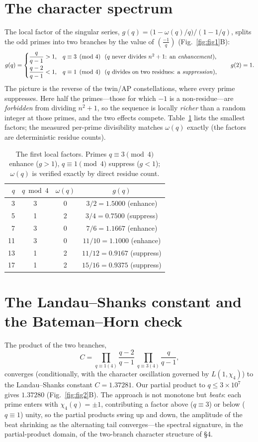 \documentclass[11pt]{article}
\theoremstyle{definition}
\begin{document}
\section{The character spectrum}
The local factor of the singular series, $g(q)=\bigl(1-\omega(q)/q\bigr)/(1-1/q)$, splits the odd
primes into two branches by the value of $\left(\frac{-1}{q}\right)$ (Fig.~\ref{fig:fig1}B):
\[
g(q)=
\begin{cases}
\dfrac{q}{q-1}>1,& q\equiv3\pmod4\ \ (\text{$q$ never divides $n^2+1$: an \emph{enhancement}}),\\[8pt]
\dfrac{q-2}{q-1}<1,& q\equiv1\pmod4\ \ (\text{$q$ divides on two residues: a \emph{suppression}}),
\end{cases}
\qquad g(2)=1.
\]
The picture is the reverse of the twin/AP constellations, where every prime suppresses. Here half the
primes---those for which $-1$ is a non-residue---are \emph{forbidden} from dividing $n^2+1$, so the
sequence is locally \emph{richer} than a random integer at those primes, and the two effects compete.
Table~\ref{tab:gq} lists the smallest factors; the measured per-prime divisibility matches
$\omega(q)$ exactly (the factors are deterministic residue counts).

\begin{table}[t]
\centering\small
\begin{tabular}{rccc}
\toprule
$q$ & $q\bmod4$ & $\omega(q)$ & $g(q)$\\
\midrule
3  & 3 & 0 & $3/2=1.5000$ (enhance)\\
5  & 1 & 2 & $3/4=0.7500$ (suppress)\\
7  & 3 & 0 & $7/6=1.1667$ (enhance)\\
11 & 3 & 0 & $11/10=1.1000$ (enhance)\\
13 & 1 & 2 & $11/12=0.9167$ (suppress)\\
17 & 1 & 2 & $15/16=0.9375$ (suppress)\\
\bottomrule
\end{tabular}
\caption{The first local factors. Primes $q\equiv3\pmod4$ enhance ($g>1$), $q\equiv1\pmod4$ suppress
($g<1$); $\omega(q)$ is verified exactly by direct residue count.}
\label{tab:gq}
\end{table}

\section{The Landau--Shanks constant and the Bateman--Horn check}
The product of the two branches,
\[
C=\prod_{q\equiv1(4)}\frac{q-2}{q-1}\ \prod_{q\equiv3(4)}\frac{q}{q-1},
\]
converges (conditionally, with the character oscillation governed by $L(1,\chi_4)$) to the
Landau--Shanks constant $C=1.37281$. Our partial product to $q\le3\times10^{7}$ gives $1.37280$
(Fig.~\ref{fig:fig2}B). The approach is not monotone but \emph{beats}: each prime enters with
$\chi_4(q)=\pm1$, contributing a factor above ($q\equiv3$) or below ($q\equiv1$) unity, so the partial
products swing up and down, the amplitude of the beat shrinking as the alternating tail converges---the
spectral signature, in the partial-product domain, of the two-branch character structure of \S4.
\end{document}
